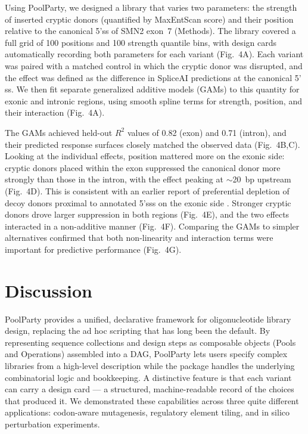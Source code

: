 \documentclass[unnumsec,webpdf,modern,large]{mam-authoring-template}%
\theoremstyle{thmstyleone}%
\theoremstyle{thmstyletwo}%
\theoremstyle{thmstylethree}%
\begin{document}
Using PoolParty, we designed a library that varies two parameters: the strength of inserted cryptic donors (quantified by MaxEntScan score) and their position relative to the canonical 5$’$ss of SMN2 exon~7 (Methods). The library covered a full grid of 100 positions and 100 strength quantile bins, with design cards automatically recording both parameters for each variant (Fig.~4A). Each variant was paired with a matched control in which the cryptic donor was disrupted, and the effect was defined as the difference in SpliceAI predictions at the canonical 5$’$ss. We then fit separate generalized additive models (GAMs) to this quantity for exonic and intronic regions, using smooth spline terms for strength, position, and their interaction (Fig.~4A).

The GAMs achieved held-out $R^2$ values of 0.82 (exon) and 0.71 (intron), and their predicted response surfaces closely matched the observed data (Fig.~4B,C). Looking at the individual effects, position mattered more on the exonic side: cryptic donors placed within the exon suppressed the canonical donor more strongly than those in the intron, with the effect peaking at ${\sim}$20~bp upstream (Fig.~4D). This is consistent with an earlier report of preferential depletion of decoy donors proximal to annotated 5$’$sss on the exonic side \citep{Dawes2022empirical}. Stronger cryptic donors drove larger suppression in both regions (Fig.~4E), and the two effects interacted in a non-additive manner (Fig.~4F). Comparing the GAMs to simpler alternatives confirmed that both non-linearity and interaction terms were important for predictive performance (Fig.~4G).


\section{Discussion}

PoolParty provides a unified, declarative framework for oligonucleotide library design, replacing the ad hoc scripting that has long been the default. By representing sequence collections and design steps as composable objects (Pools and Operations) assembled into a DAG, PoolParty lets users specify complex libraries from a high-level description while the package handles the underlying combinatorial logic and bookkeeping. A distinctive feature is that each variant can carry a design card --- a structured, machine-readable record of the choices that produced it. We demonstrated these capabilities across three quite different applications: codon-aware mutagenesis, regulatory element tiling, and in silico perturbation experiments.
\end{document}

